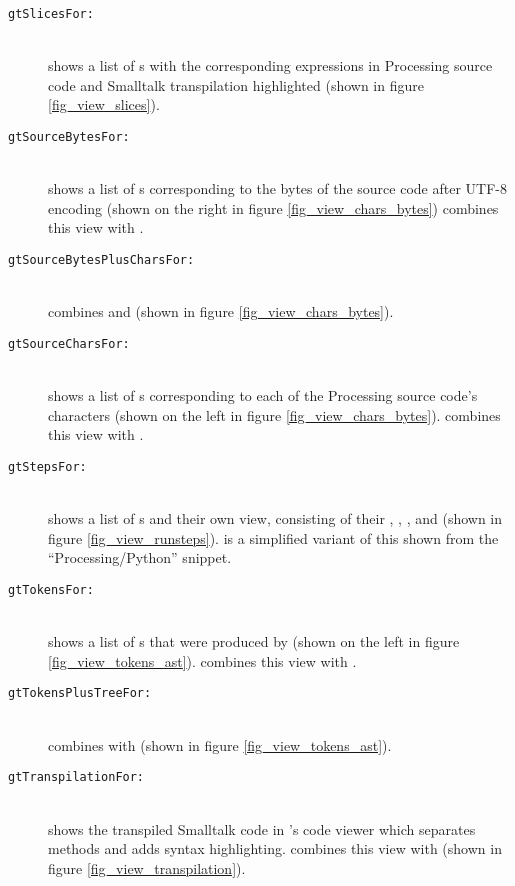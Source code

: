 \begin{description}
\item[\texttt{gtSlicesFor:}] \hfill \\
	shows a list of s with the corresponding expressions in Processing source code and Smalltalk transpilation highlighted (shown in figure \ref{fig_view_slices}).
\item[\texttt{gtSourceBytesFor:}] \hfill \\
	shows a list of s corresponding to the bytes of the source code after UTF-8 encoding (shown on the right in figure \ref{fig_view_chars_bytes})  combines this view with .
\item[\texttt{gtSourceBytesPlusCharsFor:}] \hfill \\
	combines  and  (shown in figure \ref{fig_view_chars_bytes}).
\item[\texttt{gtSourceCharsFor:}] \hfill \\
	shows a list of s corresponding to each of the Processing source code's characters (shown on the left in figure \ref{fig_view_chars_bytes}).  combines this view with .
\item[\texttt{gtStepsFor:}] \hfill \\
	shows a list of s and their own  view, consisting of their , , ,  and  (shown in figure \ref{fig_view_runsteps}).  is a simplified variant of this shown from the ``Processing/Python'' snippet.
\item[\texttt{gtTokensFor:}] \hfill \\
	shows a list of s that were produced by  (shown on the left in figure \ref{fig_view_tokens_ast}).  combines this view with .
\item[\texttt{gtTokensPlusTreeFor:}] \hfill \\
	combines  with  (shown in figure \ref{fig_view_tokens_ast}).
\item[\texttt{gtTranspilationFor:}] \hfill \\
	shows the transpiled Smalltalk code in 's code viewer which separates methods and adds syntax highlighting.  combines this view with  (shown in figure \ref{fig_view_transpilation}).

\end{description}
